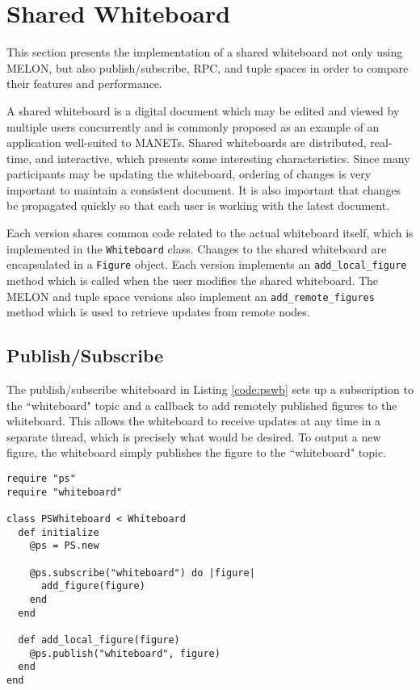 \section{Shared Whiteboard}\label{sec:wb}

This section presents the implementation of a shared whiteboard not only using MELON, but also publish/subscribe, RPC, and tuple spaces in order to compare their features and performance.

A shared whiteboard is a digital document which may be edited and viewed by multiple users concurrently and is commonly proposed as an example of an application well-suited to MANETs\cite{wb5}\cite{wb6}. Shared whiteboards are distributed, real-time, and interactive, which presents some interesting characteristics. Since many participants may be updating the whiteboard, ordering of changes is very important to maintain a consistent document. It is also important that changes be propagated quickly so that each user is working with the latest document.

Each version shares common code related to the actual whiteboard itself, which is implemented in the \texttt{Whiteboard} class. Changes to the shared whiteboard are encapsulated in a \texttt{Figure} object. Each version implements an \texttt{add\_local\_figure} method which is called when the user modifies the shared whiteboard. The MELON and tuple space versions also implement an \texttt{add\_remote\_figures} method which is used to retrieve updates from remote nodes.

\subsection{Publish/Subscribe}

The publish/subscribe whiteboard in Listing \ref{code:pswb} sets up a subscription to the ``whiteboard" topic and a callback to add remotely published figures to the whiteboard. This allows the whiteboard to receive updates at any time in a separate thread, which is precisely what would be desired. To output a new figure, the whiteboard simply publishes the figure to the ``whiteboard" topic.


\begin{lstlisting}[caption={Publish/Subscribe Whiteboard}, label={code:pswb}]
require "ps"
require "whiteboard"

class PSWhiteboard < Whiteboard
  def initialize
    @ps = PS.new
    
    @ps.subscribe("whiteboard") do |figure|
      add_figure(figure)
    end
  end

  def add_local_figure(figure)
    @ps.publish("whiteboard", figure)
  end
end
\end{lstlisting}

